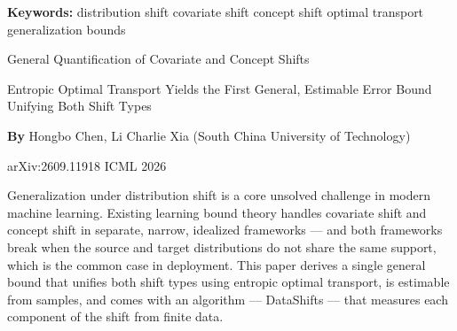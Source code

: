 \documentclass[10pt,twocolumn]{article}
\begin{document}
\setlength{\parindent}{0pt}
\setlength{\parskip}{4pt}

{\small\color{keywordgray}\textbf{Keywords:}
  distribution shift \textbullet{}
  covariate shift \textbullet{}
  concept shift \textbullet{}
  optimal transport \textbullet{}
  generalization bounds}\par\vspace{4pt}

{\LARGE\bfseries\raggedright
  General Quantification of Covariate
  and Concept Shifts}\par\vspace{4pt}

{\large\itshape\raggedright
  Entropic Optimal Transport Yields the First General,
  Estimable Error Bound Unifying Both Shift Types}\par\vspace{6pt}

{\small\textbf{By} Hongbo Chen, Li Charlie Xia
  (South China University of Technology)}\par\vspace{2pt}

{\small\color{keywordgray}arXiv:2609.11918 \textbullet{} ICML 2026}
\par\vspace{2pt}\noindent{\color{rulered}\rule{\columnwidth}{0.6pt}}\vspace{6pt}

Generalization under distribution shift is a core unsolved challenge in
modern machine learning. Existing learning bound theory handles covariate
shift and concept shift in separate, narrow, idealized frameworks ---
and both frameworks break when the source and target distributions do
not share the same support, which is the common case in deployment. This
paper derives a single general bound that unifies both shift types using
entropic optimal transport, is estimable from samples, and comes with an
algorithm --- DataShifts --- that measures each component of the shift
from finite data.
\end{document}
